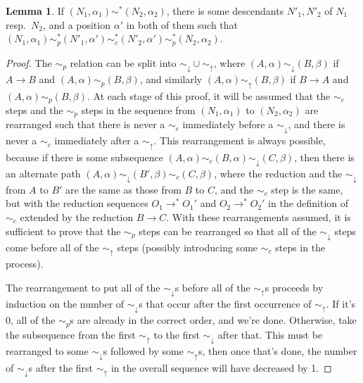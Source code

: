 \documentclass{article}
\theoremstyle{definition}
\theoremstyle{lemma}
\newtheorem{lemma}{Lemma}
\theoremstyle{remark}
\begin{document}
\begin{lemma} \label{downAcrossUp}
If $(N_1,\alpha_1) \sim^* (N_2,\alpha_2)$, there is some descendants $N'_1, N'_2$ of $N_1$ resp.~$N_2$, and a position $\alpha'$ in both of them such that $(N_1,\alpha_1) \sim_p^* (N'_1, \alpha') \sim_c^* (N'_2, \alpha') \sim_p^* (N_2, \alpha_2)$.
\end{lemma}
\begin{proof}
  The $\sim_p$ relation can be split into $\sim_\downarrow \cup \sim_\uparrow$, where $(A,\alpha) \sim_\downarrow (B,\beta)$ if $A \to B$ and $(A,\alpha) \sim_p (B,\beta)$, and similarly $(A,\alpha) \sim_\uparrow (B,\beta)$ if $B \to A$ and $(A,\alpha) \sim_p (B,\beta)$. At each stage of this proof, it will be assumed that the $\sim_c$ steps and the $\sim_p$ steps in the sequence from $(N_1,\alpha_1)$ to $(N_2,\alpha_2)$ are rearranged such that there is never a $\sim_c$ immediately before a $\sim_\downarrow$, and there is never a $\sim_c$ immediately after a $\sim_\uparrow$. This rearrangement is always possible, because if there is some subsequence $(A,\alpha) \sim_c (B,\alpha) \sim_\downarrow (C,\beta)$, then there is an alternate path $(A,\alpha) \sim_\downarrow (B',\beta) \sim_c (C,\beta)$, where the reduction and the $\sim_\downarrow$ from $A$ to $B'$ are the same as those from $B$ to $C$, and the $\sim_c$ step is the same, but with the reduction sequences $O_1 \to^* O_1'$ and $O_2 \to^* O_2'$ in the definition of $\sim_c$ extended by the reduction $B \to C$. With these rearrangements assumed, it is sufficient to prove that the $\sim_p$ steps can be rearranged so that all of the $\sim_\downarrow$ steps come before all of the $\sim_\uparrow$ steps (possibly introducing some $\sim_c$ steps in the process).

  The rearrangement to put all of the $\sim_\downarrow$s before all of the $\sim_\uparrow$s proceeds by induction on the number of $\sim_\downarrow$s that occur after the first occurrence of $\sim_\uparrow$. If it's 0, all of the $\sim_p$s are already in the correct order, and we're done. Otherwise, take the subsequence from the first $\sim_\uparrow$ to the first $\sim_\downarrow$ after that. This must be rearranged to some $\sim_\downarrow$s followed by some $\sim_\uparrow$s, then once that's done, the number of $\sim_\downarrow$s after the first $\sim_\uparrow$ in the overall sequence will have decreased by 1.


\end{proof}
\end{document}
